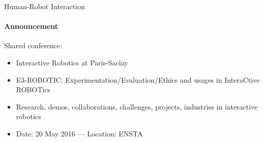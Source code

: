 \begin{frame}{Human-Robot Interaction}
  \framesubtitle{Announcement}

  Shared conference:
  \begin{itemize}
  \item Interactive Robotics at Paris-Saclay
  \item E3-ROBOTIC: Experimentation/Evaluation/Ethics and usages in InteraCtive ROBOTics
  \item Research, demos, collaborations, challenges, projects, industries in interactive robotics
  \item Date: 20 May 2016 --- Location: ENSTA
  \end{itemize}

\end{frame}




